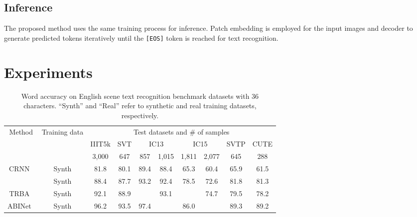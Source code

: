 \documentclass[10pt,twocolumn,letterpaper]{article}
\begin{document}
\subsection{Inference}
The proposed method uses the same training process for inference. 
Patch embedding is employed for the input images and decoder to generate predicted tokens iteratively until the \texttt{[EOS]} token is reached for text recognition. 
\section{Experiments} \label{experiments}
\begin{table*}[tb]

\centering
   \caption{
Word accuracy on English scene text recognition benchmark datasets with 36 characters. 
``Synth'' and ``Real'' refer to synthetic and real training datasets, respectively.
}
\label{tab:method_overall_result_english}
\begin{tabular}{cccccccccc}
\toprule
\multirow{3}{*}{Method} &\multirow{3}{*}{Training data} & \multicolumn{8}{c}{Test datasets and \# of samples}                                                                                                                                                                \\ \cline{3-10} 
&                         & IIIT5k                   & SVT                      & \multicolumn{2}{c}{IC13}                            & \multicolumn{2}{c}{IC15}                            & SVTP                     & CUTE                     \\ &                         & 3,000                    & 647                      & 857                      & 1,015                    & 1,811                    & 2,077                    & 645                      & 288                      \\ 
\midrule
CRNN~\cite{shi2016crnn} & Synth &81.8 & 80.1 & 89.4 & 88.4 & 65.3 & 60.4 & 65.9 & 61.5 \\ 
~\cite{atienza2021vitstr} & Synth & 88.4 & 87.7 & 93.2 & 92.4 & 78.5 & 72.6 & 81.8 & 81.3 \\
TRBA~\cite{baek2021TRBA} & Synth &92.1 & 88.9 &  & 93.1 &  & 74.7 & 79.5 & 78.2 \\
ABINet~\cite{fang2021ABINet} & Synth & 96.2 & 93.5 & 97.4 &  & 86.0 &  & 89.3 & 89.2 \\


\end{tabular}
\end{table*}
\end{document}
